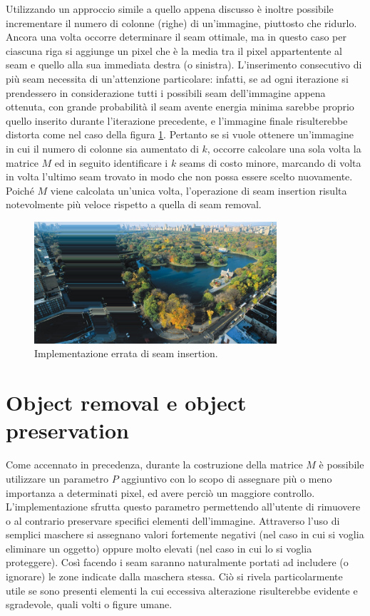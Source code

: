 \documentclass[12pt,a4paper]{report}
\theoremstyle{plain}
\theoremstyle{definition}
\begin{document}
 Utilizzando un approccio simile a quello appena discusso è inoltre possibile incrementare il numero di colonne (righe) di un'immagine, piuttosto che ridurlo. Ancora una volta occorre determinare il seam ottimale, ma in questo caso per ciascuna riga si aggiunge un pixel che è la media tra il pixel appartentente al seam e quello alla sua immediata destra (o sinistra). L'inserimento consecutivo di più seam necessita di un'attenzione particolare: infatti, se ad ogni iterazione si prendessero in considerazione tutti i possibili seam dell'immagine appena ottenuta, con grande probabilità il seam avente energia minima sarebbe proprio quello inserito durante l'iterazione precedente, e l'immagine finale risulterebbe distorta come nel caso della figura \ref{bad_insert}. Pertanto se si vuole ottenere un'immagine in cui il numero di colonne sia aumentato di $k$, occorre calcolare una sola volta la matrice $M$ ed in seguito identificare i $k$ seams di costo minore, marcando di volta in volta l'ultimo seam trovato in modo che non possa essere scelto nuovamente. Poiché $M$ viene calcolata un'unica volta, l'operazione di seam insertion risulta notevolmente più veloce rispetto a quella di seam removal.
 \begin{figure}[h]
\centering
\includegraphics[width=9cm]{insertion}
\caption{Implementazione errata di seam insertion.}
\label{bad_insert}
\end{figure}

\section*{Object removal e object preservation}
Come accennato in precedenza, durante la costruzione della matrice $M$ è possibile utilizzare un parametro $P$ aggiuntivo con lo scopo di assegnare più o meno importanza a determinati pixel, ed avere perciò un maggiore controllo. L'implementazione sfrutta questo parametro permettendo all'utente di rimuovere o al contrario preservare specifici elementi dell'immagine. Attraverso l'uso di semplici maschere si assegnano valori fortemente negativi (nel caso in cui si voglia eliminare un oggetto) oppure molto elevati (nel caso in cui lo si voglia proteggere). Così facendo i seam saranno naturalmente portati ad includere (o ignorare) le zone indicate dalla maschera stessa. Ciò si rivela particolarmente utile se sono presenti elementi la cui eccessiva alterazione risulterebbe evidente e sgradevole, quali volti o figure umane. 
\end{document}
